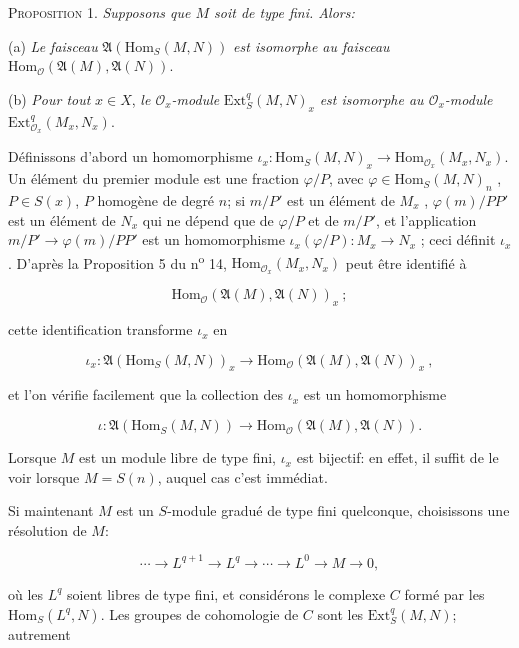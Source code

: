 \textsc{Proposition} 1. \textit{Supposons que $M$ soit de type fini. Alors:}

(a) \textit{Le faisceau} $\mathfrak{A}(\mathrm{Hom}_S(M, N))$ \textit{est isomorphe au faisceau} $\mathrm{Hom}_{\mathcal{O}}(\mathfrak{A}(M), \mathfrak{A}(N))$.

(b) \textit{Pour tout} $x \in X$, \textit{le $\mathcal{O}_x$-module} $\mathrm{Ext}_S^q(M, N)_x$ \textit{est isomorphe au $\mathcal{O}_x$-module} $\mathrm{Ext}_{\mathcal{O}_x}^q(M_x , N_x)$.

Définissons d'abord un homomorphisme $\iota_x: \mathrm{Hom}_S(M, N)_x \rightarrow \mathrm{Hom}_{\mathcal{O}_x}(M_x , N_x)$. Un élément du premier module est une fraction $\varphi/P$, avec $\varphi \in \mathrm{Hom}_S(M, N)_n$ , $P \in S(x)$, $P$ homogène de degré $n$; si $m/P'$ est un élément de $M_x$ , $\varphi(m)/PP'$ est un élément de $N_x$ qui ne dépend que de $\varphi/P$ et de $m/P'$, et l'application $m/P' \rightarrow \varphi(m)/PP'$ est un homomorphisme $\iota_x(\varphi/P): M_x \rightarrow N_x$ ; ceci définit $\iota_x$ . D'après la Proposition 5 du n\textsuperscript{o} 14, $\mathrm{Hom}_{\mathcal{O}_x}(M_x , N_x)$ peut être identifié à

\begin{equation*}
\mathrm{Hom}_{\mathcal{O}}(\mathfrak{A}(M), \mathfrak{A}(N))_x \ ;
\end{equation*}

cette identification transforme $\iota_x$ en

\begin{equation*}
\iota_x : \mathfrak{A}(\mathrm{Hom}_S(M, N))_x \longrightarrow \mathrm{Hom}_{\mathcal{O}}(\mathfrak{A}(M), \mathfrak{A}(N))_x \ ,
\end{equation*}

et l'on vérifie facilement que la collection des $\iota_x$ est un homomorphisme

\begin{equation*}
\iota : \mathfrak{A}(\mathrm{Hom}_S(M, N)) \longrightarrow \mathrm{Hom}_{\mathcal{O}}(\mathfrak{A}(M), \mathfrak{A}(N)).
\end{equation*}

Lorsque $M$ est un module libre de type fini, $\iota_x$ est bijectif: en effet, il suffit de le voir lorsque $M = S(n)$, auquel cas c'est immédiat.

Si maintenant $M$ est un $S$-module gradué de type fini quelconque, choisissons une résolution de $M$:

\begin{equation*}
\cdots \rightarrow L^{q+1} \rightarrow L^q \rightarrow \cdots \rightarrow L^0 \rightarrow M \rightarrow 0,
\end{equation*}

où les $L^q$ soient libres de type fini, et considérons le complexe $C$ formé par les $\mathrm{Hom}_S(L^q, N)$. Les groupes de cohomologie de $C$ sont les $\mathrm{Ext}_S^q(M, N)$; autrement
